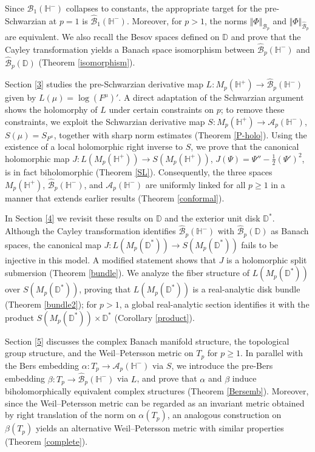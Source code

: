 \documentclass[amstex,12pt,reqno]{amsart}
\theoremstyle{definition}
\begin{document}
Since $\mathcal B_1(\mathbb H^-)$ collapses to constants, the appropriate target for the pre-Schwarzian at $p=1$ is 
$\widehat{\mathcal B}_1(\mathbb H^-)$. Moreover, for $p>1$, the norms $\Vert\Phi\Vert_{\mathcal B_p}$ and
$\Vert \Phi \Vert_{\widehat{\mathcal B}_p}$ are equivalent.
We also recall the Besov spaces defined on 
$\mathbb D$ and prove that the Cayley transformation yields a Banach space isomorphism
between $\widehat{\mathcal B}_p(\mathbb H^-)$ and $\widehat{\mathcal B}_p(\mathbb D)$ (Theorem \ref{isomorphism}).

Section \ref{3} studies the pre-Schwarzian derivative map
$L:M_p(\mathbb H^+) \to \widehat{\mathcal B}_p(\mathbb H^-)$ given by $L(\mu)=\log (F^\mu)'$.
A direct adaptation of the Schwarzian argument shows the holomorphy of $L$ under certain constraints on $p$; to remove these constraints, we exploit the Schwarzian derivative map
$S:M_p(\mathbb H^+) \to \mathcal A_p(\mathbb H^-)$, $S(\mu)=S_{F^\mu}$,
together with sharp norm estimates (Theorem \ref{P-holo}). Using the existence of a local holomorphic right inverse to $S$, we prove that the canonical holomorphic map
$J:L(M_p(\mathbb H^+)) \to S(M_p(\mathbb H^+))$, $J(\Psi)=\Psi''-\tfrac12(\Psi')^2$,
is in fact biholomorphic (Theorem \ref{SL}). Consequently, the three spaces $M_p(\mathbb H^+)$, $\widehat{\mathcal B}_p(\mathbb H^-)$, and $\mathcal A_p(\mathbb H^-)$ are uniformly linked for all $p \geq 1$ in a manner that extends earlier results (Theorem \ref{conformal}).

In Section \ref{4} we revisit these results on $\mathbb D$ and the exterior unit disk $\mathbb D^*$. Although the Cayley transformation 
identifies $\widehat{\mathcal B}_p(\mathbb H^-)$ with $\widehat{\mathcal B}_p(\mathbb D)$ as Banach spaces, 
the canonical map
$J:L(M_p(\mathbb D^*)) \to S(M_p(\mathbb D^*))$
fails to be injective in this model. A modified statement shows that $J$ is a holomorphic split submersion (Theorem \ref{bundle}). We analyze the fiber structure of $L(M_p(\mathbb D^*))$ over $S(M_p(\mathbb D^*))$, proving that $L(M_p(\mathbb D^*))$ is a real-analytic disk bundle (Theorem \ref{bundle2}); for $p>1$, a global real-analytic section identifies it with the product $S(M_p(\mathbb D^*))\times\mathbb D^*$ (Corollary \ref{product}).

Section \ref{5} discusses the complex Banach manifold structure, the topological group structure, and the Weil--Petersson metric on $T_p$ for $p\ge1$. In parallel with the Bers embedding $\alpha:T_p\to \mathcal A_p(\mathbb H^-)$ via $S$, 
we introduce the pre-Bers embedding
$\beta:T_p\to \widehat{\mathcal B}_p(\mathbb H^-)$
via $L$, and prove that $\alpha$ and $\beta$ induce biholomorphically equivalent complex structures (Theorem \ref{Bersemb}). Moreover, since the Weil--Petersson metric can be regarded as an invariant metric obtained by
right translation of 
the norm on $\alpha(T_p)$, an analogous construction on $\beta(T_p)$ yields an alternative Weil--Petersson metric with similar properties (Theorem \ref{complete}).
\end{document}
